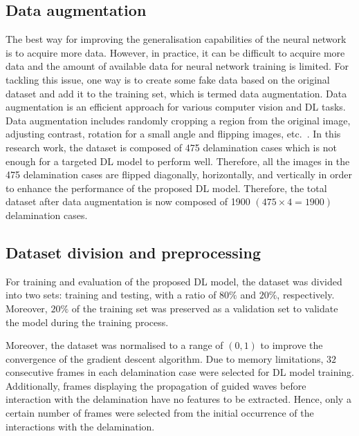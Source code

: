\subsection{Data augmentation}
The best way for improving the generalisation capabilities of the neural network is to acquire more data. 
However, in practice, it can be difficult to acquire more data and the amount of available data for neural network training is limited.
For tackling this issue, one way is to create some fake data based on the original dataset and add it to the training set, which is termed data augmentation. 
Data augmentation is an efficient approach for various computer vision and DL tasks. 
Data augmentation includes randomly cropping a region from the original image, adjusting contrast, rotation for a small angle and flipping images, etc.~\cite{szegedy2015going}.
In this research work, the dataset is composed of 475 delamination cases which is not enough for a targeted DL model to perform well.
Therefore, all the images in the 475 delamination cases are flipped diagonally, horizontally, and vertically in order to enhance the performance of the proposed DL model. 
Therefore, the total dataset after data augmentation is now composed of 1900 \((475\times4 = 1900)\) delamination cases.
\subsection{Dataset division and preprocessing}
For training and evaluation of the proposed DL model, the dataset was divided into two sets: training and testing, with a ratio of \(80\%\) and \(20\%\), respectively.
Moreover, \(20\%\) of the training set was preserved as a validation set to validate the model during the training process.

Moreover, the dataset was normalised to a range of \((0, 1)\) to improve the convergence of the gradient descent algorithm.
Due to memory limitations, \(32\) consecutive frames in each delamination case were selected for DL model training.
Additionally, frames displaying the propagation of guided waves before interaction with the delamination have no features to be extracted.
Hence, only a certain number of frames were selected from the initial occurrence of the interactions with the delamination.

